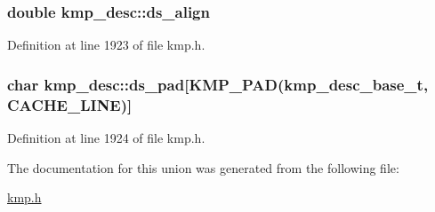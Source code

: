 \hypertarget{unionkmp__desc_a07ddc184d874a557a32e0a840768c046}{
\subsubsection[{ds\-\_\-align}]{\setlength{\rightskip}{0pt plus 5cm}double kmp\-\_\-desc\-::ds\-\_\-align}}\label{unionkmp__desc_a07ddc184d874a557a32e0a840768c046}


Definition at line 1923 of file kmp.\-h.

\hypertarget{unionkmp__desc_a45b5eb29d9e37aba9ac0f8e618097a2a}{
\subsubsection[{ds\-\_\-pad}]{\setlength{\rightskip}{0pt plus 5cm}char kmp\-\_\-desc\-::ds\-\_\-pad\mbox{[}{\bf K\-M\-P\-\_\-\-P\-A\-D}({\bf kmp\-\_\-desc\-\_\-base\-\_\-t}, {\bf C\-A\-C\-H\-E\-\_\-\-L\-I\-N\-E})\mbox{]}}}\label{unionkmp__desc_a45b5eb29d9e37aba9ac0f8e618097a2a}


Definition at line 1924 of file kmp.\-h.



The documentation for this union was generated from the following file\-:\begin{DoxyCompactItemize}
\item 
\hyperlink{kmp_8h}{kmp.\-h}\end{DoxyCompactItemize}
